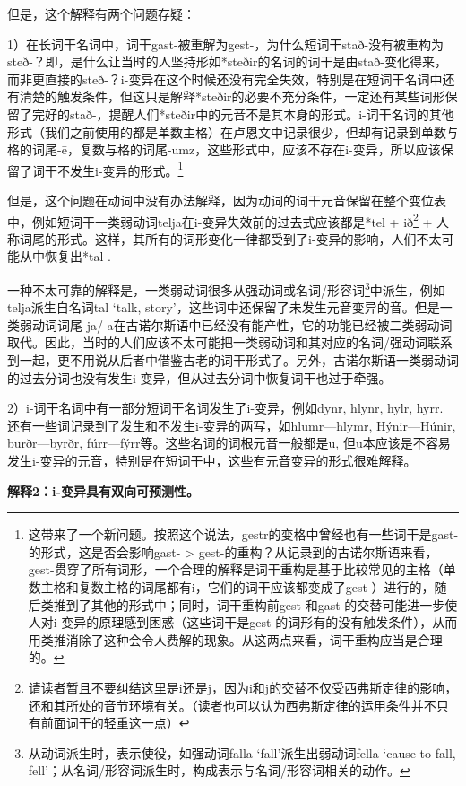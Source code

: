 但是，这个解释有两个问题存疑：

1）在长词干名词中，词干gast-被重解为gest-，为什么短词干stað-没有被重构为steð-？即，是什么让当时的人坚持形如*steðir的名词的词干是由stað-变化得来，而非更直接的steð-？i-变异在这个时候还没有完全失效，特别是在短词干名词中还有清楚的触发条件，但这只是解释*steðir的必要不充分条件，一定还有某些词形保留了完好的stað-，提醒人们*steðir中的元音不是其本身的形式。i-词干名词的其他形式（我们之前使用的都是单数主格）在卢恩文中记录很少，但却有记录到单数与格的词尾-ē，复数与格的词尾-umz，这些形式中，应该不存在i-变异，所以应该保留了词干不发生i-变异的形式。\footnote{这带来了一个新问题。按照这个说法，gestr的变格中曾经也有一些词干是gast-的形式，这是否会影响gast-
  \textgreater{}
  gest-的重构？从记录到的古诺尔斯语来看，gest-贯穿了所有词形，一个合理的解释是词干重构是基于比较常见的主格（单数主格和复数主格的词尾都有i，它们的词干应该都变成了gest-）进行的，随后类推到了其他的形式中；同时，词干重构前gest-和gast-的交替可能进一步使人对i-变异的原理感到困惑（这些词干是gest-的词形有的没有触发条件），从而用类推消除了这种会令人费解的现象。从这两点来看，词干重构应当是合理的。}

但是，这个问题在动词中没有办法解释，因为动词的词干元音保留在整个变位表中，例如短词干一类弱动词telja在i-变异失效前的过去式应该都是*tel
+ ið\footnote{请读者暂且不要纠结这里是i还是j，因为i和j的交替不仅受西弗斯定律的影响，还和其所处的音节环境有关。（读者也可以认为西弗斯定律的运用条件并不只有前面词干的轻重这一点）}
+
人称词尾的形式。这样，其所有的词形变化一律都受到了i-变异的影响，人们不太可能从中恢复出*tal-.

一种不太可靠的解释是，一类弱动词很多从强动词或名词/形容词\footnote{从动词派生时，表示使役，如强动词falla
  `fall'派生出弱动词fella `cause to fall,
  fell'；从名词/形容词派生时，构成表示与名词/形容词相关的动作。}中派生，例如telja派生自名词tal
`talk,
story'，这些词中还保留了未发生元音变异的音。但是一类弱动词词尾-ja/-a在古诺尔斯语中已经没有能产性，它的功能已经被二类弱动词取代。因此，当时的人们应该不太可能把一类弱动词和其对应的名词/强动词联系到一起，更不用说从后者中借鉴古老的词干形式了。另外，古诺尔斯语一类弱动词的过去分词也没有发生i-变异，但从过去分词中恢复词干也过于牵强。

2）i-词干名词中有一部分短词干名词发生了i-变异，例如dynr, hlynr, hylr,
hyrr. 还有一些词记录到了发生和不发生i-变异的两写，如hlumr---hlymr,
Hýnir---Húnir, burðr---byrðr,
fúrr---fýrr等。这些名词的词根元音一般都是u,
但u本应该是不容易发生i-变异的元音，特别是在短词干中，这些有元音变异的形式很难解释。

\textbf{解释2：i-变异具有双向可预测性。}

